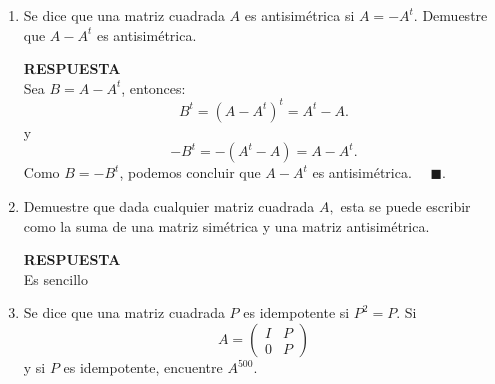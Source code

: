 \documentclass[11pt,letterpaper]{article}
\newcommand{\res}{\textbf{RESPUESTA}\\}
\newcommand{\fin}{$\blacksquare.$}
\newcommand{\finf}{\blacksquare.}
\begin{document}
\begin{enumerate}
\res
Multiplicado por $A^{p-1}$ por la izquierda y $B^{q-1}$ por la derecha tenemos que:

$$A^{p-1}(AB)B^{q-1}=A^{p-1}(BA)B^{q-1} \ \ \ \ \finf$$


\item Se dice que una matriz cuadrada $A$ es antisimétrica si $A=-A^t.$ Demuestre que $A-A^t$ es antisimétrica.

\res
Sea $B=A-A^t$, entonces:
$$B^t=(A-A^t)^t=A^t-A.$$
y $$-B^t=-(A^t-A)=A-A^t.$$
Como $B=-B^t$, podemos concluir que   $A-A^t$ es antisimétrica. \ \ \fin

\item Demuestre que dada cualquier matriz cuadrada $A,$ esta se puede escribir como la suma de una matriz simétrica y una matriz antisimétrica.

\res
Es sencillo
\item Se dice que una matriz cuadrada $P$ es idempotente si $P^2=P$. Si 
\begin{equation*}
A=\left(\begin{array}{cc}
I& P\\
0&P
\end{array}
\right)
\end{equation*}
y si $P$ es idempotente, encuentre $A^{500}.$


\end{enumerate}
\end{document}
